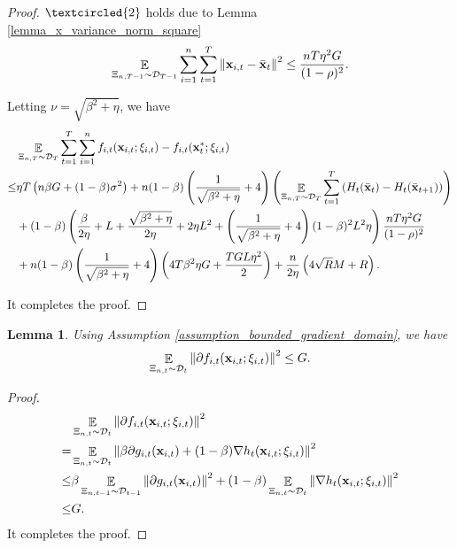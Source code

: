\documentclass{article}
\newtheorem{Lemma}{\bf{Lemma}}
\begin{document}
\begin{proof}
$\textcircled{2}$ holds due to Lemma \ref{lemma_x_variance_norm_square}
\begin{align}
\nonumber
\mathop{\mathbb{E}}_{ \Xi_{n,T-1} \sim \mathcal{D}_{T-1} } \sum_{i=1}^n\sum_{t=1}^T \left\lVert{\bf x}_{i,t} - \bar{{\bf x}}_t\right\rVert^2 \le \frac{nT\eta^2 G }{(1-\rho)^2}.
\end{align}





Letting $\nu = \sqrt{\beta^2 + \eta}$, we have
\begin{align}
\nonumber
& \mathop{\mathbb{E}}_{ \Xi_{n,T} \sim \mathcal{D}_{T} } \sum_{t=1}^T\sum_{i=1}^n f_{i,t}({\bf x}_{i,t};\xi_{i,t}) - f_{i,t}({\bf x}_t^\ast;\xi_{i,t}) \\ \nonumber
\le & \eta T \left(  n\beta G + (1-\beta)\sigma^2 \right) + n(1-\beta)\left(  \frac{1}{\sqrt{\beta^2 + \eta}} + 4  \right) \left(  \mathop{\mathbb{E}}_{ \Xi_{n,T} \sim \mathcal{D}_{T} } \sum_{t=1}^T  \left( H_t(\bar{{\bf x}}_t) - H_t(\bar{{\bf x}}_{t+1}) \right)   \right) \\ \nonumber
& + (1-\beta)\left( \frac{\beta}{2\eta } +L + \frac{\sqrt{\beta^2 + \eta}}{2\eta} + 2\eta L^2  + \left( \frac{1}{\sqrt{\beta^2 + \eta}} + 4 \right)(1-\beta)^2L^2 \eta \right)  \frac{nT\eta^2 G }{(1-\rho)^2}  \\ \nonumber
& + n(1-\beta)\left(  \frac{1}{\sqrt{\beta^2 + \eta}} + 4  \right) \left(  4T\beta^2 \eta G + \frac{TGL\eta^2}{2}  \right)  + \frac{n}{2\eta}\left(  4\sqrt{R}M + R   \right).
\end{align}



It completes the proof.



\end{proof}


\begin{Lemma}
\label{lemma_stochastic_gradient_norm_bound}
Using Assumption \ref{assumption_bounded_gradient_domain}, we have
\begin{align}
\nonumber
\mathop{\mathbb{E}}_{ \Xi_{n,t} \sim \mathcal{D}_{t} }\left\lVert \partial f_{i,t}({\bf x}_{i,t};\xi_{i,t})\right\rVert^2 \le G.
\end{align}


\end{Lemma}
\begin{proof}

\begin{align}
\nonumber
& \mathop{\mathbb{E}}_{ \Xi_{n,t} \sim \mathcal{D}_{t} }\left\lVert \partial f_{i,t}({\bf x}_{i,t};\xi_{i,t})\right\rVert^2 \\ \nonumber 
= & \mathop{\mathbb{E}}_{ \Xi_{n,t} \sim \mathcal{D}_{t} }\left\lVert \beta \partial g_{i,t}({\bf x}_{i,t}) + (1-\beta)\nabla h_t({\bf x}_{i,t};\xi_{i,t})\right\rVert^2 \\ \nonumber 
\le &  \beta \mathop{\mathbb{E}}_{ \Xi_{n,t-1} \sim \mathcal{D}_{t-1} }\left\lVert \partial g_{i,t}({\bf x}_{i,t}) \right\rVert^2 + (1-\beta) \mathop{\mathbb{E}}_{ \Xi_{n,t} \sim \mathcal{D}_{t} } \left\lVert \nabla h_t({\bf x}_{i,t};\xi_{i,t}) \right\rVert^2 \\ \nonumber 
\le & G.
\end{align} It completes the proof.
\end{proof}
\end{document}
